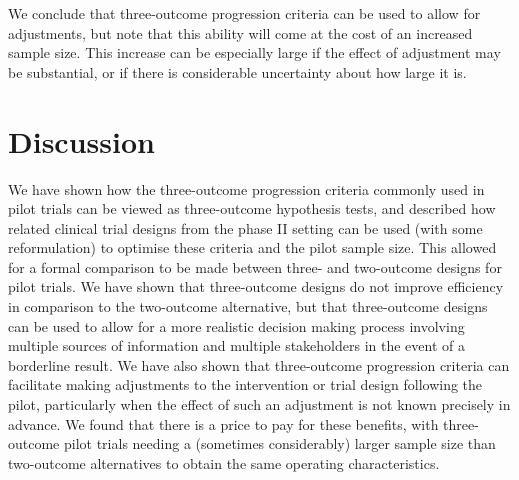 \documentclass{bmcart}
\begin{document}
We conclude that three-outcome progression criteria can be used to allow for adjustments, but note that this ability will come at the cost of an increased sample size. This increase can be especially large if the effect of adjustment may be substantial, or if there is considerable uncertainty about how large it is.

\section{Discussion}\label{sec:discussion}





We have shown how the three-outcome progression criteria commonly used in pilot trials can be viewed as three-outcome hypothesis tests, and described how related clinical trial designs from the phase II setting can be used (with some reformulation) to optimise these criteria and the pilot sample size. This allowed for a formal comparison to be made between three- and two-outcome designs for pilot trials. We have shown that three-outcome designs do not improve efficiency in comparison to the two-outcome alternative, but that three-outcome designs can be used to allow for a more realistic decision making process involving multiple sources of information and multiple stakeholders in the event of a borderline result. We have also shown that three-outcome progression criteria can facilitate making adjustments to the intervention or trial design following the pilot, particularly when the effect of such an adjustment is not known precisely in advance. We found that there is a price to pay for these benefits, with three-outcome pilot trials needing a (sometimes considerably) larger sample size than two-outcome alternatives to obtain the same operating characteristics.  
\end{document}
